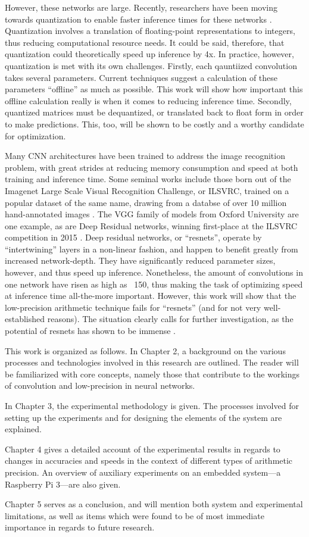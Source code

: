 However, these networks are large. Recently, researchers have been moving towards quantization to enable faster inference times for these networks \cite{warden_quantize}. Quantization involves a translation of floating-point representations to integers, thus reducing computational resource needs. It could be said, therefore, that quantization could theoretically speed up inference by 4x. In practice, however, quantization is met with its own challenges. Firstly, each qauntiized convolution takes several parameters. Current techniques suggest a calculation of these parameters ``offline'' as much as possible. This work will show how important this offline calculation really is when it comes to reducing inference time. Secondly, quantized matrices must be dequantized, or translated back to float form in order to make predictions. This, too, will be shown to be costly and a worthy candidate for optimization.

Many CNN architectures have been trained to address the image recognition problem, with great strides at reducing memory consumption and speed at both training and inference time. Some seminal works include those born out of the Imagenet Large Scale Visual Recognition Challenge, or ILSVRC, trained on a popular dataset of the same name, drawing from a databse of over 10 million hand-annotated images \cite{imagenet}. The VGG family of models from Oxford University \cite{return} are one example, as are Deep Residual networks, winning first-place at the ILSVRC competition in 2015 \cite{resnets2}. Deep residual networks, or ``resnets'', operate by ``intertwining'' layers in a non-linear fashion, and happen to benefit greatly from increased network-depth. They have significantly reduced parameter sizes, however, and thus speed up inference. Nonetheless, the amount of convolutions in one network have risen as high as ~150, thus making the task of optimizing speed at inference time all-the-more important. However, this work will show that the low-precision arithmetic technique fails for ``resnets'' (and for not very well-established reasons). The situation clearly calls for further investigation, as the potential of resnets has shown to be immense \cite{resnets1}.

This work is organized as follows. In Chapter 2, a background on the various processes and technologies involved in this research are outlined. The reader will be familiarized with core concepts, namely those that contribute to the workings of convolution and low-precision in neural networks. 

In Chapter 3, the experimental methodology is given. The processes involved for setting up the experiments and for designing the elements of the system are explained.

Chapter 4 gives a detailed account of the experimental results in regards to changes in accuracies and speeds in the context of different types of arithmetic precision. An overview of auxiliary experiments on an embedded system---a Raspberry Pi 3---are also given.

Chapter 5 serves as a conclusion, and will mention both system and experimental limitations, as well as items which were found to be of most immediate importance in regards to future research.